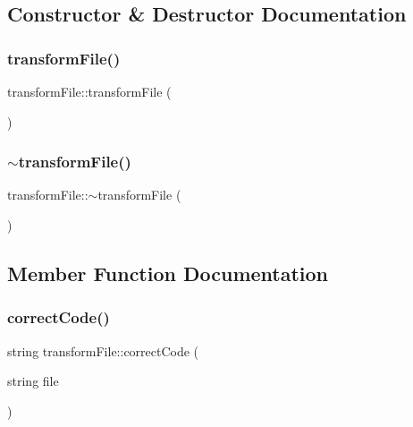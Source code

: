 \subsection{Constructor \& Destructor Documentation}
\mbox{\label{classtransform_file_a3c30c0beee695f0734ab360522fdba5c}} 
\subsubsection{\texorpdfstring{transform\+File()}{transformFile()}}
{\footnotesize\ttfamily transform\+File\+::transform\+File (\begin{DoxyParamCaption}{ }\end{DoxyParamCaption})}

\mbox{\label{classtransform_file_af012d67d96337385c20585da0789f6e9}} 
\subsubsection{\texorpdfstring{$\sim$transform\+File()}{~transformFile()}}
{\footnotesize\ttfamily transform\+File\+::$\sim$transform\+File (\begin{DoxyParamCaption}{ }\end{DoxyParamCaption})}



\subsection{Member Function Documentation}
\mbox{\label{classtransform_file_a3aa75a96c0b8ac1b1355cbce80218b2b}} 
\subsubsection{\texorpdfstring{correct\+Code()}{correctCode()}}
{\footnotesize\ttfamily string transform\+File\+::correct\+Code (\begin{DoxyParamCaption}\item[{string}]{file }\end{DoxyParamCaption})}

